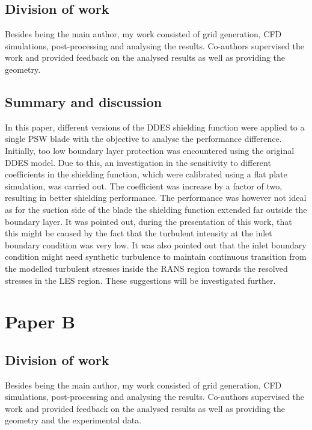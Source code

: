 \subsection{Division of work}
Besides being the main author, my work consisted of grid generation, CFD simulations, post-processing and analysing the results. Co-authors supervised the work and provided feedback on the analysed results as well as providing the geometry.
\subsection{Summary and discussion}
In this paper, different versions of the DDES shielding function were applied to a single PSW blade with the objective to analyse the performance difference. Initially, too low boundary layer protection was encountered using the original DDES model. Due to this, an investigation in the sensitivity to different coefficients in the shielding function, which were calibrated using a flat plate simulation, was carried out. The coefficient was increase by a factor of two, resulting in better shielding performance. The performance was however not ideal as for the suction side of the blade the shielding function extended far outside the boundary layer. It was pointed out, during the presentation of this work, that this might be caused by the fact that the turbulent intensity at the inlet boundary condition was very low. It was also pointed out that the inlet boundary condition might need synthetic turbulence to maintain continuous transition from the modelled turbulent stresses inside the RANS region towards the resolved stresses in the LES region. These suggestions will be investigated further.


\section{Paper B} 
\subsection{Division of work}
Besides being the main author, my work consisted of grid generation, CFD simulations, post-processing and analysing the results. Co-authors supervised the work and provided feedback on the analysed results as well as providing the geometry and the experimental data.
